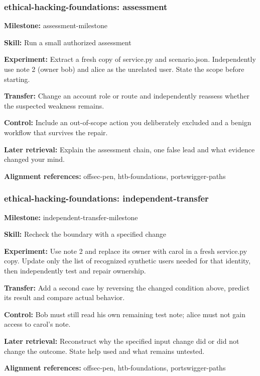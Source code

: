 \subsubsection{ethical-hacking-foundations: assessment}
\noindent\textbf{Milestone:} assessment-milestone\par
\noindent\textbf{Skill:} Run a small authorized assessment\par
\noindent\textbf{Experiment:} Extract a fresh copy of service.py and scenario.json. Independently use note 2 (owner bob) and alice as the unrelated user. State the scope before starting.\par
\noindent\textbf{Transfer:} Change an account role or route and independently reassess whether the suspected weakness remains.\par
\noindent\textbf{Control:} Include an out-of-scope action you deliberately excluded and a benign workflow that survives the repair.\par
\noindent\textbf{Later retrieval:} Explain the assessment chain, one false lead and what evidence changed your mind.\par
\noindent\textbf{Alignment references:} offsec-pen, htb-foundations, portswigger-paths\par
\subsubsection{ethical-hacking-foundations: independent-transfer}
\noindent\textbf{Milestone:} independent-transfer-milestone\par
\noindent\textbf{Skill:} Recheck the boundary with a specified change\par
\noindent\textbf{Experiment:} Use note 2 and replace its owner with carol in a fresh service.py copy. Update only the list of recognized synthetic users needed for that identity, then independently test and repair ownership.\par
\noindent\textbf{Transfer:} Add a second case by reversing the changed condition above, predict its result and compare actual behavior.\par
\noindent\textbf{Control:} Bob must still read his own remaining test note; alice must not gain access to carol’s note.\par
\noindent\textbf{Later retrieval:} Reconstruct why the specified input change did or did not change the outcome. State help used and what remains untested.\par
\noindent\textbf{Alignment references:} offsec-pen, htb-foundations, portswigger-paths\par
